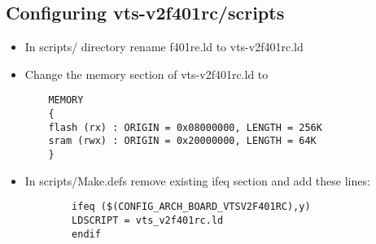 \subsection*{Configuring vts-v2f401rc/scripts}

\begin{itemize}
	
	\item In scripts/ directory rename f401re.ld to vts-v2f401rc.ld
	\item Change the memory section of vts-v2f401rc.ld to 
	\begin{verbatim}
	MEMORY
	{
	flash (rx) : ORIGIN = 0x08000000, LENGTH = 256K
	sram (rwx) : ORIGIN = 0x20000000, LENGTH = 64K
	}
	\end{verbatim}
	\pagebreak
	\item In scripts/Make.defs remove  existing ifeq section and add these lines:
	\begin{verbatim}
		ifeq ($(CONFIG_ARCH_BOARD_VTSV2F401RC),y)
		LDSCRIPT = vts_v2f401rc.ld
		endif
	\end{verbatim}
	
\end{itemize}


